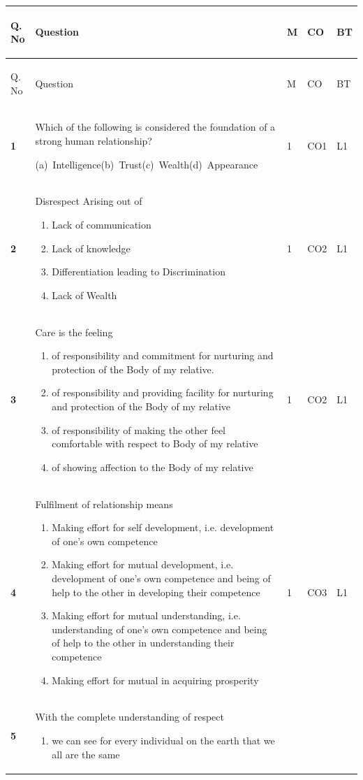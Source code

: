 \documentclass[11pt,a4paper,oneside]{book}
\newcommand{\optsinline}[4]{\par\vspace{3pt}%
  {\small\color{slate}(a)~#1\quad (b)~#2\quad (c)~#3\quad (d)~#4}}
\newenvironment{optlist}
  {\par\vspace{2pt}\begingroup\small\color{slate}%
   \begin{enumerate}[label={\color{slatelight}(\alph*)},leftmargin=2.0em,
     itemsep=1pt,topsep=2pt,parsep=0pt]}
  {\end{enumerate}\endgroup\vspace{1pt}}
\newcommand{\hdr}[1]{{\sffamily\bfseries\color{white}\strut #1}}
\newenvironment{qtable}
  {\renewcommand{\arraystretch}{1.28}%
   \arrayrulecolor{rulegrey}%
   \setlength{\LTpre}{6pt}\setlength{\LTpost}{4pt}%
   \begin{longtable}{C{11mm} P{108mm} C{10mm} C{12mm} C{9mm}}
   \rowcolor{slate}
   \hdr{Q.\,No} & \hdr{Question} & \hdr{M} & \hdr{CO} & \hdr{BT}
   \\ \hline \endfirsthead
   \rowcolor{slate}
   \hdr{Q.\,No} & \hdr{Question} & \hdr{M} & \hdr{CO} & \hdr{BT}
   \\ \hline \endhead}
  {\end{longtable}}
\newcommand{\qn}[1]{{\sffamily\bfseries\color{ocre}#1}}
\begin{document}
\begin{qtable}
\qn{1} & Which of the following is considered the foundation of a strong human
  relationship?
  \optsinline{Intelligence}{Trust}{Wealth}{Appearance}
  & 1 & CO1 & L1 \\ \hline
\qn{2} & Disrespect Arising out of
  \begin{optlist}
  \item Lack of communication
  \item Lack of knowledge
  \item Differentiation leading to Discrimination
  \item Lack of Wealth
  \end{optlist}
  & 1 & CO2 & L1 \\ \hline
\qn{3} & Care is the feeling
  \begin{optlist}
  \item of responsibility and commitment for nurturing and protection of the
        Body of my relative.
  \item of responsibility and providing facility for nurturing and protection
        of the Body of my relative
  \item of responsibility of making the other feel comfortable with respect to
        Body of my relative
  \item of showing affection to the Body of my relative
  \end{optlist}
  & 1 & CO2 & L1 \\ \hline
\qn{4} & Fulfilment of relationship means
  \begin{optlist}
  \item Making effort for self development, i.e. development of one's own
        competence
  \item Making effort for mutual development, i.e. development of one's own
        competence and being of help to the other in developing their
        competence
  \item Making effort for mutual understanding, i.e. understanding of one's
        own competence and being of help to the other in understanding their
        competence
  \item Making effort for mutual in acquiring prosperity
  \end{optlist}
  & 1 & CO3 & L1 \\ \hline
\qn{5} & With the complete understanding of respect
  \begin{optlist}
  \item we can see for every individual on the earth that we all are the same

\end{optlist}
\end{qtable}
\end{document}
